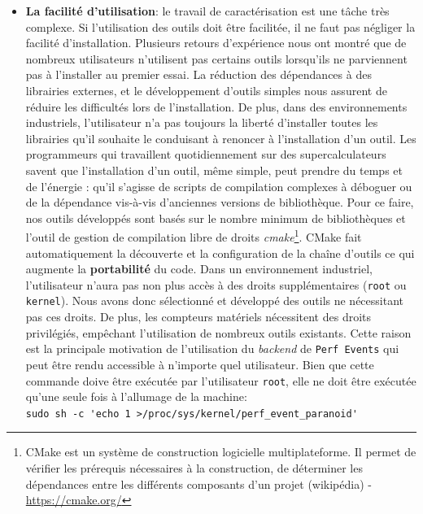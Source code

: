 \begin{itemize}
        \item \textbf{La facilité d'utilisation}: le travail de caractérisation est une tâche très complexe. Si l'utilisation des outils doit être facilitée, il ne faut pas négliger la facilité d'installation. Plusieurs retours d'expérience nous ont montré que de nombreux utilisateurs n'utilisent pas certains outils lorsqu'ils ne parviennent pas à l'installer au premier essai. La réduction des dépendances à des librairies externes, et le développement d'outils simples nous assurent de réduire les difficultés lors de l'installation. De plus, dans des environnements industriels, l'utilisateur n'a pas toujours la liberté d'installer toutes les librairies qu'il souhaite le conduisant à renoncer à l'installation d'un outil. Les programmeurs qui travaillent quotidiennement sur des supercalculateurs savent que l'installation d'un outil, même simple, peut prendre du temps et de l'énergie : qu'il s'agisse de scripts de compilation complexes à déboguer ou de la dépendance vis-à-vis d’anciennes versions de bibliothèque. Pour ce faire, nos outils développés sont basés sur le nombre minimum de bibliothèques et l'outil de gestion de compilation libre de droits \textit{cmake}\footnote{CMake est un système de construction logicielle multiplateforme. Il permet de vérifier les prérequis nécessaires à la construction, de déterminer les dépendances entre les différents composants d'un projet (wikipédia) - \url{https://cmake.org/}}. CMake fait automatiquement la découverte et la configuration de la chaîne d'outils ce qui augmente la \textbf{portabilité} du code.
        Dans un environnement industriel, l'utilisateur n'aura pas non plus accès à des droits supplémentaires (\verb=root= ou \verb=kernel=). Nous avons donc sélectionné et développé des outils ne nécessitant pas ces droits. De plus, les compteurs matériels nécessitent des droits privilégiés, empêchant l'utilisation de nombreux outils existants. Cette raison est la principale motivation de l'utilisation du \textit{backend} de \verb=Perf Events= qui peut être rendu accessible à n'importe quel utilisateur. Bien que cette commande doive être exécutée par l'utilisateur \verb=root=, elle ne doit être exécutée qu'une seule fois à l'allumage de la machine:\\
        \verb|sudo sh -c 'echo 1 >/proc/sys/kernel/perf_event_paranoid'|\\
    
    \end{itemize}

        
        
